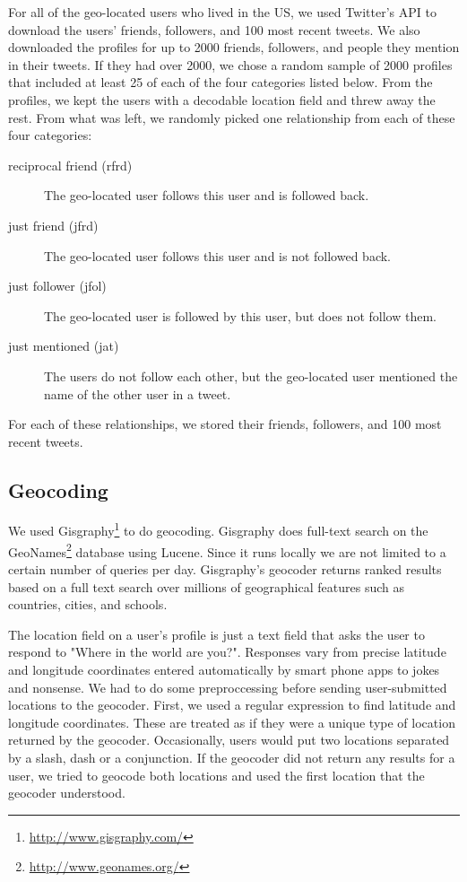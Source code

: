 \documentclass{sig-alternate}
\begin{document}
For all of the geo-located users who lived in the US, we used Twitter's API to download the users' friends, followers, and 100 most recent tweets.
We also downloaded the profiles for up to 2000 friends, followers, and people they mention in their tweets. If they had over 2000, we chose a random sample of 2000 profiles that included at least 25 of each of the four categories listed below.
From the profiles, we kept the users with a decodable location field and threw away the rest. From what was left, we randomly picked one relationship from each of these four categories:
\begin{description}
\item[reciprocal friend (rfrd)] The geo-located user follows this user and is followed back.
\item[just friend (jfrd)] The geo-located user follows this user and is not followed back.
\item[just follower (jfol)]The geo-located user is followed by this user, but does not follow them.
\item[just mentioned (jat)] The users do not follow each other, but the geo-located user mentioned the name of the other user in a tweet.
\end{description}
For each of these relationships, we stored their friends, followers, and 100 most recent tweets.

\subsection{Geocoding}
We used Gisgraphy\footnote{\url{http://www.gisgraphy.com/}} to do geocoding.
Gisgraphy does full-text search on the GeoNames\footnote{\url{http://www.geonames.org/}}
database using Lucene. Since
it runs locally we are not limited to a certain number of queries per day.
Gisgraphy's geocoder returns ranked results based on a full text search
over millions of geographical features such as countries, cities, and schools. 

The location field on a user's profile is just a text field that asks the user to respond to "Where in the world are you?".
Responses vary from precise latitude and longitude coordinates entered automatically by smart phone apps to jokes and nonsense.
We had to do some preproccessing before sending user-submitted locations to the geocoder.
First, we used a regular expression to find latitude and longitude coordinates. These are treated as if they were a unique type of location returned by the geocoder.
Occasionally, users would put two locations separated by a slash, dash or a conjunction. If the geocoder did not return any results for a user, we tried to geocode both locations and used the first location that the geocoder understood.
\end{document}
